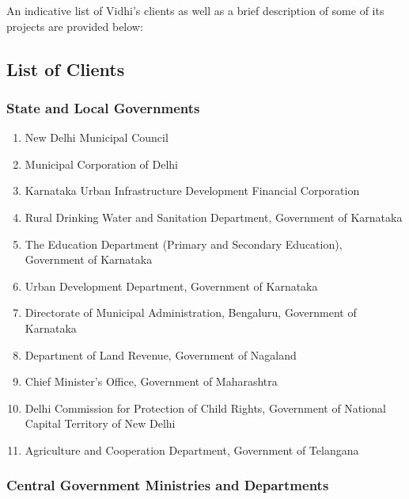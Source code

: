 \documentclass[a4paper,11pt]{article}
\begin{document}
An indicative list of Vidhi’s clients as well as a brief description of some of its projects are provided below:

\subsection{List of Clients}
    \subsubsection{State and Local Governments}
        
        \begin{enumerate}
            \item New Delhi Municipal Council 
            \item Municipal Corporation of Delhi 
            \item Karnataka Urban Infrastructure Development Financial Corporation
            \item Rural Drinking Water and Sanitation Department, Government of Karnataka
            \item The Education Department (Primary and Secondary Education), Government of Karnataka
            \item Urban Development Department, Government of Karnataka
            \item Directorate of Municipal Administration, Bengaluru, Government of Karnataka
            \item Department of Land Revenue, Government of Nagaland
            \item Chief Minister’s Office, Government of Maharashtra
            \item Delhi Commission for Protection of Child Rights, Government of National Capital Territory of New Delhi
            \item Agriculture and Cooperation Department, Government of Telangana 

        \end{enumerate}
        
        \subsubsection{Central Government Ministries and Departments}
        
\end{document}
